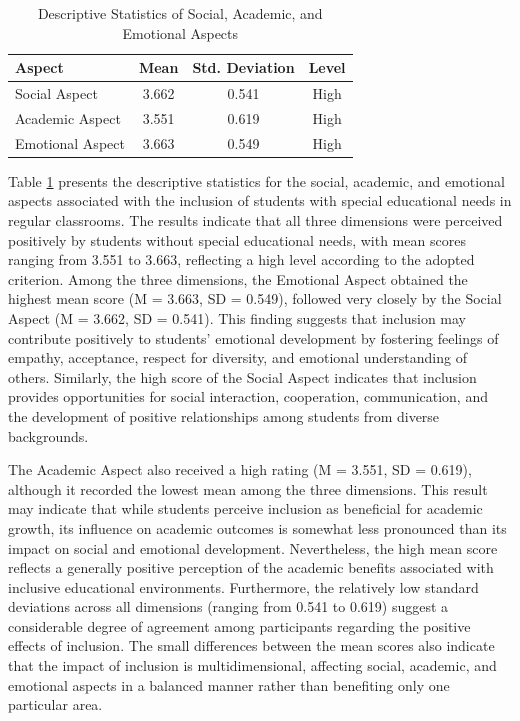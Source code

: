 \documentclass[10pt]{NSP1}
\begin{document}
	\begin{table}[H]
		\centering
		\caption{Descriptive Statistics of Social, Academic, and Emotional Aspects}
		\label{tab:desc-overall}
		\begin{tabular}{lccc}
			\toprule
			\textbf{Aspect} & \textbf{Mean} & \textbf{Std. Deviation} & \textbf{Level} \\
			\midrule
			Social Aspect    & 3.662 & 0.541 & High \\
			Academic Aspect  & 3.551 & 0.619 & High \\
			Emotional Aspect & 3.663 & 0.549 & High \\
			\bottomrule
		\end{tabular}
	\end{table}

	Table \ref{tab:desc-overall} presents the descriptive statistics for the social, academic, and emotional aspects associated with the inclusion of students with special educational needs in regular classrooms. The results indicate that all three dimensions were perceived positively by students without special educational needs, with mean scores ranging from 3.551 to 3.663, reflecting a high level according to the adopted criterion. Among the three dimensions, the Emotional Aspect obtained the highest mean score (M = 3.663, SD = 0.549), followed very closely by the Social Aspect (M = 3.662, SD = 0.541). This finding suggests that inclusion may contribute positively to students' emotional development by fostering feelings of empathy, acceptance, respect for diversity, and emotional understanding of others. Similarly, the high score of the Social Aspect indicates that inclusion provides opportunities for social interaction, cooperation, communication, and the development of positive relationships among students from diverse backgrounds.

	The Academic Aspect also received a high rating (M = 3.551, SD = 0.619), although it recorded the lowest mean among the three dimensions. This result may indicate that while students perceive inclusion as beneficial for academic growth, its influence on academic outcomes is somewhat less pronounced than its impact on social and emotional development. Nevertheless, the high mean score reflects a generally positive perception of the academic benefits associated with inclusive educational environments. Furthermore, the relatively low standard deviations across all dimensions (ranging from 0.541 to 0.619) suggest a considerable degree of agreement among participants regarding the positive effects of inclusion. The small differences between the mean scores also indicate that the impact of inclusion is multidimensional, affecting social, academic, and emotional aspects in a balanced manner rather than benefiting only one particular area.
\end{document}
